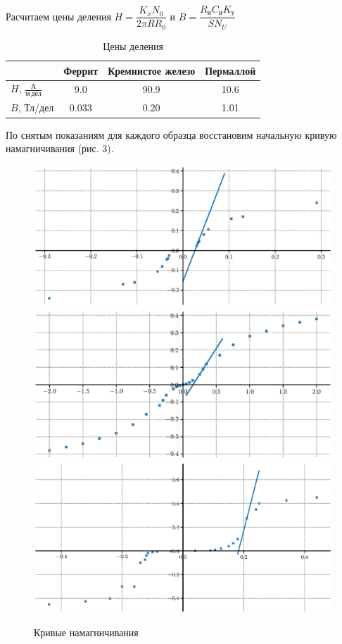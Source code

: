 \documentclass[12pt,a4paper]{article}
\begin{document}
Расчитаем цены деления $H = \dfrac{K_xN_0}{2\pi R R_0}$ и $B = \dfrac{R_и C_и K_у}{S N_U}$

\begin{table}[H]
    \centering
    \begin{tabular}[]{|l|c|c|c|}
        \hline
        &Феррит&Кремнистое железо&Пермаллой \\ \hline
        $H$, $\frac{А}{м\ дел}$ &9.0 &90.9&10.6 \\ \hline
        $B$, Тл/дел &0.033 &0.20 &1.01 \\ \hline
    \end{tabular}
    \caption{Цены деления}
\end{table}

По снятым показаниям для каждого образца восстановим начальную кривую намагничивания (рис. 3).

\begin{figure}[H]
	\centering	

    \includegraphics[width=0.9\linewidth]{pics/ferr.eps}
    \includegraphics[width=0.9\linewidth]{pics/sife.eps}
    \includegraphics[width=0.9\linewidth]{pics/perm.eps}

	\caption{Кривые намагничивания}
\end{figure}
\end{document}
